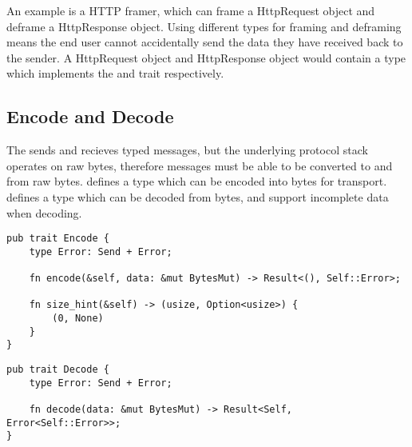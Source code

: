 An example is a HTTP framer, which can frame a HttpRequest object and deframe a HttpResponse object.
Using different types for framing and deframing means the end user cannot accidentally send the data they have received
back to the sender.
A HttpRequest object and HttpResponse object would contain a type which implements the \encode{} and \decode{}
trait respectively.

\subsection{Encode and Decode}\label{subsec:encode-and-decode}
The \connection{} sends and recieves typed messages, but the underlying protocol stack operates on raw bytes,
therefore messages must be able to be converted to and from raw bytes.
\encode{} defines a type which can be encoded into bytes for transport.
\decode{} defines a type which can be decoded from bytes, and support incomplete data when decoding.

\begin{lstlisting}[float=h, label=lst:encode, caption={The Encode trait, showing the size\_hint method.}]
pub trait Encode {
    type Error: Send + Error;

    fn encode(&self, data: &mut BytesMut) -> Result<(), Self::Error>;

    fn size_hint(&self) -> (usize, Option<usize>) {
        (0, None)
    }
}
\end{lstlisting}

\begin{lstlisting}[float=h, label=lst:decode, caption={The Decode trait.}]
pub trait Decode {
    type Error: Send + Error;

    fn decode(data: &mut BytesMut) -> Result<Self, Error<Self::Error>>;
}
\end{lstlisting}

